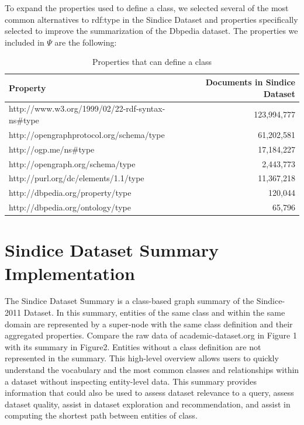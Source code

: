 \documentclass[11pt,onecolumn]{article}
\begin{document}
To expand the properties used to define a class, we selected several of the most common alternatives to rdf:type in the Sindice Dataset and properties specifically selected to improve the summarization of the Dbpedia dataset. The properties we included in $\Psi$ are the following:

\begin{table}[h!]
\begin{center}
  \begin{tabular}{| l | r | }
    \hline
    {\bf Property} & {\bf Documents in Sindice Dataset} \\ \hline    
    http://www.w3.org/1999/02/22-rdf-syntax-ns\#type & 123,994,777 \\ \hline
    http://opengraphprotocol.org/schema/type & 61,202,581 \\ \hline
    http://ogp.me/ns\#type & 17,184,227 \\ \hline
    http://opengraph.org/schema/type & 2,443,773 \\ \hline
    http://purl.org/dc/elements/1.1/type & 11,367,218 \\ \hline
    http://dbpedia.org/property/type & 120,044\\ \hline
    http://dbpedia.org/ontology/type & 65,796\\ \hline
  \end{tabular}
\end{center}
\caption{Properties that can define a class}
\end{table}



\section{Sindice Dataset Summary Implementation}

The Sindice Dataset Summary is a class-based graph summary of the Sindice-2011 Dataset.  In this summary, entities of the same class and within the same domain are represented by a super-node with the same class definition and their aggregated properties.  Compare the raw data of academic-dataset.org in Figure 1 with its summary in Figure2.  Entities without a class definition are not represented in the summary. This high-level overview allows users to quickly understand the vocabulary and the most common classes and relationships within a dataset without inspecting entity-level data.  This summary provides information that could also be used to assess dataset relevance to a query, assess dataset quality, assist in dataset exploration and recommendation, and assist in computing the shortest path between entities of class.  
\end{document}
